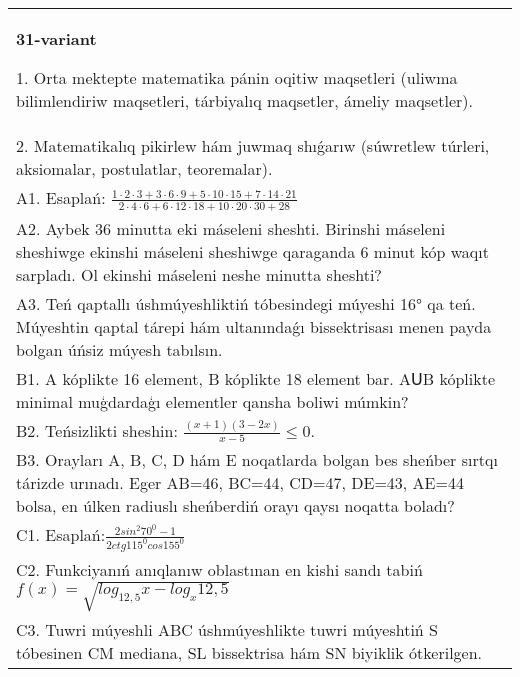 \documentclass{article}
\begin{document}
\begin{tabular}{m{17cm}}
\textbf{31-variant}

1. Orta mektepte matematika pánin oqitiw maqsetleri (uliwma bilimlendiriw maqsetleri, tárbiyalıq maqsetler, ámeliy maqsetler). \\
2. Matematikalıq pikirlew hám juwmaq shıǵarıw (súwretlew túrleri, aksiomalar, postulatlar, teoremalar). \\
A1. Esaplań: \(\frac{1 \cdot 2 \cdot 3 + 3 \cdot 6 \cdot 9 + 5 \cdot 10 \cdot 15 + 7 \cdot 14 \cdot 21}{2 \cdot 4 \cdot 6 + 6 \cdot 12 \cdot 18 + 10 \cdot 20 \cdot 30 + 28}\) \\
A2. Aybek 36 minutta eki máseleni sheshti. Birinshi máseleni sheshiwge ekinshi máseleni sheshiwge qaraganda 6 minut kóp waqıt sarpladı. Ol ekinshi máseleni neshe minutta sheshti? \\
A3. Teń qaptallı úshmúyeshliktiń tóbesindegi múyeshi 16° qa teń. Múyeshtin qaptal tárepi hám ultanındaǵı bissektrisası menen payda bolgan úńsiz múyesh tabılsın. \\
B1. A kóplikte 16 element, B kóplikte 18 element bar. AՍB kóplikte minimal muģdardaģı elementler qansha boliwi múmkin? \\
B2. Teńsizlikti sheshin: \(\frac{ (x + 1) (3 - 2x) }{x - 5} \leq 0\). \\
B3. Orayları A, B, C, D hám E noqatlarda bolgan bes sheńber sırtqı tárizde urınadı. Eger AB=46, BC=44, CD=47, DE=43, AE=44 bolsa, en úlken radiuslı sheńberdiń orayı qaysı noqatta boladı? \\
C1. Esaplań:\(\frac{2sin^{2}70^{0} - 1}{2ctg115^{0}cos155^{0}}\) \\
C2. Funkciyanıń anıqlanıw oblastınan en kishi sandı tabiń \(f (x) = \sqrt{log_{12,5}x - log_{x}12,5}\) \\
C3. Tuwri múyeshli ABC úshmúyeshlikte tuwri múyeshtiń S tóbesinen CM mediana, SL bissektrisa hám SN biyiklik ótkerilgen. \\

\end{tabular}
\vspace{1cm}
\end{document}
